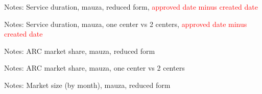\documentclass[12pt]{article}
\begin{document}
\begin{table}[htbp!]
    \begin{center}
    \caption{}
    
    \label{tab:intiqal_3_service_duration_mauza_reduced_3_4}
    \end{center}
    \justifying
Notes: Service duration, mauza, reduced form, \textcolor{red}{approved date minus created date}

\par\vspace{2.5cm}
\end{table}

\begin{table}[htbp!]
    \begin{center}
    \caption{}
    
    \label{tab:intiqal_3_service_duration_mauza_3_4}
    \end{center}
    \justifying
Notes: Service duration, mauza, one center vs 2 centers, \textcolor{red}{approved date minus created date}

\par\vspace{2.5cm}
\end{table}

\begin{table}[htbp!]
    \begin{center}
    \caption{}
    
    \label{tab:intiqal_arc_marketshare_mauza_reduced_3_4}
    \end{center}
    \justifying
Notes: ARC market share, mauza, reduced form

\par\vspace{2.5cm}
\end{table}

\begin{table}[htbp!]
    \begin{center}
    \caption{}
    
    \label{tab:intiqal_arc_marketshare_mauza_3_4}
    \end{center}
    \justifying
Notes: ARC market share, mauza, one center vs 2 centers

\par\vspace{2.5cm}
\end{table}

\begin{table}[htbp!]
    \begin{center}
    \caption{}
    
    \label{tab:intiqal_marketsize_mauza_reduced_3_4}
    \end{center}
    \justifying
Notes: Market size (by month), mauza, reduced form

\par\vspace{2.5cm}
\end{table}
\end{document}
